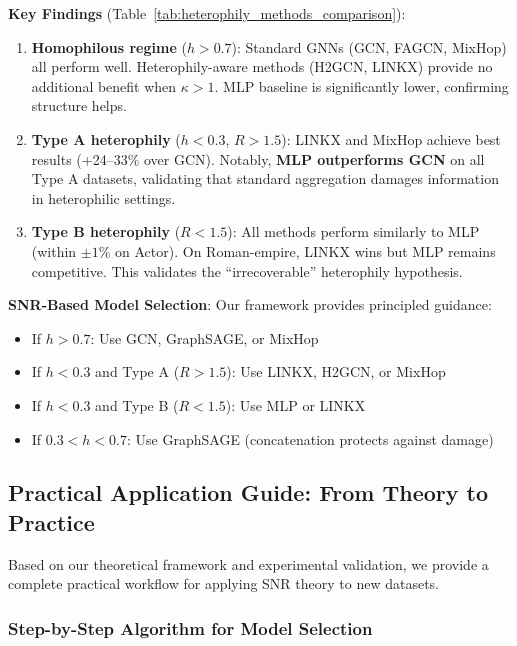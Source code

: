 \textbf{Key Findings} (Table~\ref{tab:heterophily_methods_comparison}):
\begin{enumerate}
    \item \textbf{Homophilous regime} ($h > 0.7$): Standard GNNs (GCN, FAGCN, MixHop) all perform well. Heterophily-aware methods (H2GCN, LINKX) provide no additional benefit when $\kappa > 1$. MLP baseline is significantly lower, confirming structure helps.

    \item \textbf{Type A heterophily} ($h < 0.3$, $R > 1.5$): LINKX and MixHop achieve best results (+24--33\% over GCN). Notably, \textbf{MLP outperforms GCN} on all Type A datasets, validating that standard aggregation damages information in heterophilic settings.

    \item \textbf{Type B heterophily} ($R < 1.5$): All methods perform similarly to MLP (within $\pm 1$\% on Actor). On Roman-empire, LINKX wins but MLP remains competitive. This validates the ``irrecoverable'' heterophily hypothesis.
\end{enumerate}

\textbf{SNR-Based Model Selection}: Our framework provides principled guidance:
\begin{itemize}
    \item If $h > 0.7$: Use GCN, GraphSAGE, or MixHop
    \item If $h < 0.3$ and Type A ($R > 1.5$): Use LINKX, H2GCN, or MixHop
    \item If $h < 0.3$ and Type B ($R < 1.5$): Use MLP or LINKX
    \item If $0.3 < h < 0.7$: Use GraphSAGE (concatenation protects against damage)
\end{itemize}

\subsection{Practical Application Guide: From Theory to Practice}
\label{sec:practical_guide}

Based on our theoretical framework and experimental validation, we provide a complete practical workflow for applying SNR theory to new datasets.

\subsubsection{Step-by-Step Algorithm for Model Selection}

